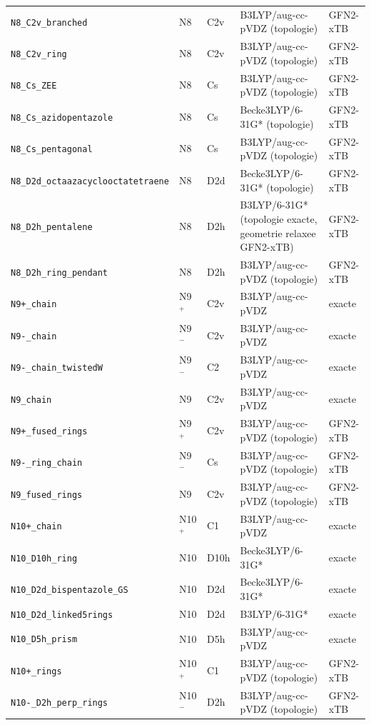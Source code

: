 \begin{longtable}{@{}p{4.4cm}p{1.3cm}p{1.2cm}p{4.1cm}p{1.9cm}@{}}
\texttt{N8\_C2v\_branched} & N8 & C2v & B3LYP/aug-cc-pVDZ (topologie) & GFN2-xTB \\
\texttt{N8\_C2v\_ring} & N8 & C2v & B3LYP/aug-cc-pVDZ (topologie) & GFN2-xTB \\
\texttt{N8\_Cs\_ZEE} & N8 & Cs & B3LYP/aug-cc-pVDZ (topologie) & GFN2-xTB \\
\texttt{N8\_Cs\_azidopentazole} & N8 & Cs & Becke3LYP/6-31G* (topologie) & GFN2-xTB \\
\texttt{N8\_Cs\_pentagonal} & N8 & Cs & B3LYP/aug-cc-pVDZ (topologie) & GFN2-xTB \\
\texttt{N8\_D2d\_octaazacyclooctatetraene} & N8 & D2d & Becke3LYP/6-31G* (topologie) & GFN2-xTB \\
\texttt{N8\_D2h\_pentalene} & N8 & D2h & B3LYP/6-31G* (topologie exacte, geometrie relaxee GFN2-xTB) & GFN2-xTB \\
\texttt{N8\_D2h\_ring\_pendant} & N8 & D2h & B3LYP/aug-cc-pVDZ (topologie) & GFN2-xTB \\
\texttt{N9+\_chain} & N9$^{+}$ & C2v & B3LYP/aug-cc-pVDZ & exacte \\
\texttt{N9-\_chain} & N9$^{-}$ & C2v & B3LYP/aug-cc-pVDZ & exacte \\
\texttt{N9-\_chain\_twistedW} & N9$^{-}$ & C2 & B3LYP/aug-cc-pVDZ & exacte \\
\texttt{N9\_chain} & N9 & C2v & B3LYP/aug-cc-pVDZ & exacte \\
\texttt{N9+\_fused\_rings} & N9$^{+}$ & C2v & B3LYP/aug-cc-pVDZ (topologie) & GFN2-xTB \\
\texttt{N9-\_ring\_chain} & N9$^{-}$ & Cs & B3LYP/aug-cc-pVDZ (topologie) & GFN2-xTB \\
\texttt{N9\_fused\_rings} & N9 & C2v & B3LYP/aug-cc-pVDZ (topologie) & GFN2-xTB \\
\texttt{N10+\_chain} & N10$^{+}$ & C1 & B3LYP/aug-cc-pVDZ & exacte \\
\texttt{N10\_D10h\_ring} & N10 & D10h & Becke3LYP/6-31G* & exacte \\
\texttt{N10\_D2d\_bispentazole\_GS} & N10 & D2d & Becke3LYP/6-31G* & exacte \\
\texttt{N10\_D2d\_linked5rings} & N10 & D2d & B3LYP/6-31G* & exacte \\
\texttt{N10\_D5h\_prism} & N10 & D5h & B3LYP/aug-cc-pVDZ & exacte \\
\texttt{N10+\_rings} & N10$^{+}$ & C1 & B3LYP/aug-cc-pVDZ (topologie) & GFN2-xTB \\
\texttt{N10-\_D2h\_perp\_rings} & N10$^{-}$ & D2h & B3LYP/aug-cc-pVDZ (topologie) & GFN2-xTB \\

\end{longtable}
